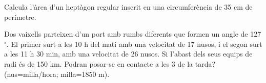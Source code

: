 \begin{mylist}
	\exer
	Calcula  l'àrea d'un heptàgon regular inscrit en una circumferència de
	35 cm de perímetre.
	
	\exer
	Dos vaixells parteixen d'un port amb rumbs diferents que formen un
	angle de 127${}^\circ$. El primer surt a les 10 h del matí amb una velocitat de
	17 nusos, i el segon surt a les 11 h 30 min, amb una velocitat de 26
	nusos. Si l'abast dels seus equips de radi és de 150 km. Podran
	posar-se en contacte a les 3 de la tarda? (nus=milla/hora; milla=1850
	m).
	
\end{mylist}

